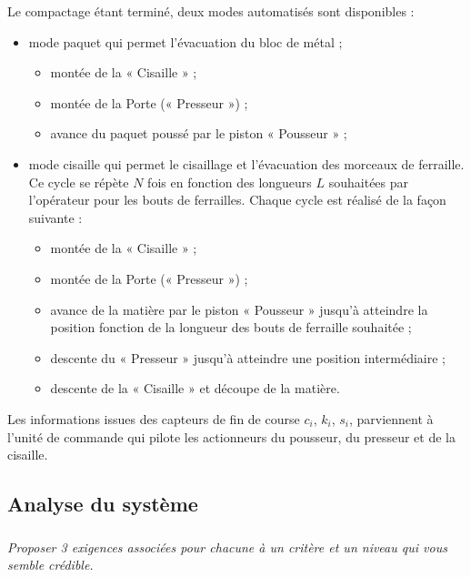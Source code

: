 \documentclass[10pt,oneside]{article}
\begin{document}
{Le compactage étant terminé, deux modes automatisés sont disponibles : 
\begin{itemize}
\item mode paquet qui permet l’évacuation du bloc de métal ;
\begin{itemize}
\item montée de la « Cisaille » ;
\item montée de la Porte (« Presseur ») ;
\item avance du paquet poussé par le piston « Pousseur » ; 
\end{itemize}
\item mode cisaille qui permet le cisaillage et l’évacuation des morceaux de ferraille. 
Ce cycle se répète $N$ fois en fonction des longueurs $L$ souhaitées par l’opérateur pour les bouts de ferrailles. Chaque cycle est réalisé de la façon suivante : 
\begin{itemize}
\item montée de la « Cisaille » ;
\item montée de la Porte (« Presseur ») ;
\item avance de la matière par le piston « Pousseur » jusqu’à atteindre la position fonction de la longueur des bouts de ferraille souhaitée ;
\item descente du « Presseur » jusqu’à atteindre une position intermédiaire ;
\item descente de la « Cisaille » et découpe de la matière.
\end{itemize}
\end{itemize}
Les informations issues des capteurs de fin de course $c_i$, $k_i$, $s_i$, parviennent à l’unité de commande qui pilote les actionneurs du pousseur, du presseur et de la cisaille.
}

\subsection{Analyse du système}


\subparagraph{}
\textit{Proposer 3 exigences associées pour chacune à un critère et un niveau qui vous semble crédible.}
\end{document}
